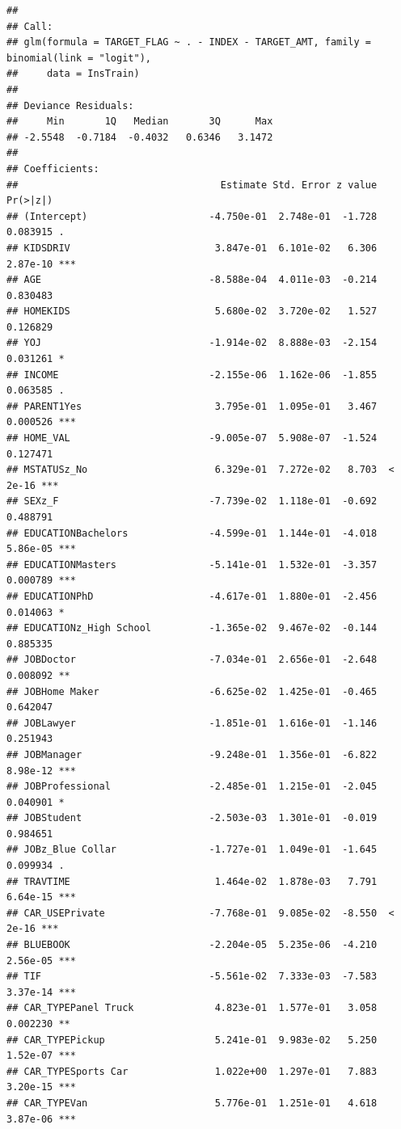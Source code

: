 \documentclass[]{article}
\begin{document}
\begin{verbatim}
## 
## Call:
## glm(formula = TARGET_FLAG ~ . - INDEX - TARGET_AMT, family = binomial(link = "logit"), 
##     data = InsTrain)
## 
## Deviance Residuals: 
##     Min       1Q   Median       3Q      Max  
## -2.5548  -0.7184  -0.4032   0.6346   3.1472  
## 
## Coefficients:
##                                   Estimate Std. Error z value Pr(>|z|)    
## (Intercept)                     -4.750e-01  2.748e-01  -1.728 0.083915 .  
## KIDSDRIV                         3.847e-01  6.101e-02   6.306 2.87e-10 ***
## AGE                             -8.588e-04  4.011e-03  -0.214 0.830483    
## HOMEKIDS                         5.680e-02  3.720e-02   1.527 0.126829    
## YOJ                             -1.914e-02  8.888e-03  -2.154 0.031261 *  
## INCOME                          -2.155e-06  1.162e-06  -1.855 0.063585 .  
## PARENT1Yes                       3.795e-01  1.095e-01   3.467 0.000526 ***
## HOME_VAL                        -9.005e-07  5.908e-07  -1.524 0.127471    
## MSTATUSz_No                      6.329e-01  7.272e-02   8.703  < 2e-16 ***
## SEXz_F                          -7.739e-02  1.118e-01  -0.692 0.488791    
## EDUCATIONBachelors              -4.599e-01  1.144e-01  -4.018 5.86e-05 ***
## EDUCATIONMasters                -5.141e-01  1.532e-01  -3.357 0.000789 ***
## EDUCATIONPhD                    -4.617e-01  1.880e-01  -2.456 0.014063 *  
## EDUCATIONz_High School          -1.365e-02  9.467e-02  -0.144 0.885335    
## JOBDoctor                       -7.034e-01  2.656e-01  -2.648 0.008092 ** 
## JOBHome Maker                   -6.625e-02  1.425e-01  -0.465 0.642047    
## JOBLawyer                       -1.851e-01  1.616e-01  -1.146 0.251943    
## JOBManager                      -9.248e-01  1.356e-01  -6.822 8.98e-12 ***
## JOBProfessional                 -2.485e-01  1.215e-01  -2.045 0.040901 *  
## JOBStudent                      -2.503e-03  1.301e-01  -0.019 0.984651    
## JOBz_Blue Collar                -1.727e-01  1.049e-01  -1.645 0.099934 .  
## TRAVTIME                         1.464e-02  1.878e-03   7.791 6.64e-15 ***
## CAR_USEPrivate                  -7.768e-01  9.085e-02  -8.550  < 2e-16 ***
## BLUEBOOK                        -2.204e-05  5.235e-06  -4.210 2.56e-05 ***
## TIF                             -5.561e-02  7.333e-03  -7.583 3.37e-14 ***
## CAR_TYPEPanel Truck              4.823e-01  1.577e-01   3.058 0.002230 ** 
## CAR_TYPEPickup                   5.241e-01  9.983e-02   5.250 1.52e-07 ***
## CAR_TYPESports Car               1.022e+00  1.297e-01   7.883 3.20e-15 ***
## CAR_TYPEVan                      5.776e-01  1.251e-01   4.618 3.87e-06 ***

\end{verbatim}
\end{document}
